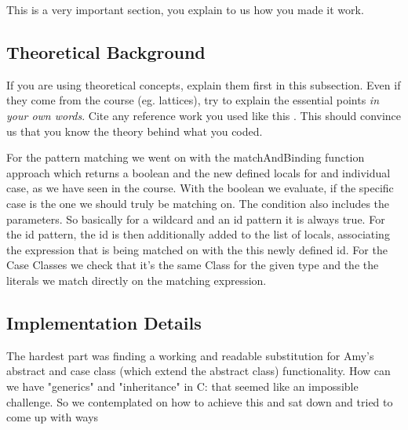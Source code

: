 This is a very important section, you explain to us how you made it work.

\subsection{Theoretical Background}
If you are using theoretical concepts, explain them first in this subsection.
Even if they come from the course (eg. lattices), try to explain the essential
points \emph{in your own words}. Cite any reference work you used like this
\cite{TigerBook}. This should convince us that you know the theory behind what
you coded.

For the pattern matching we went on with the matchAndBinding function approach which returns a boolean and the new defined locals for and individual case, as we have seen in the course. With the boolean we evaluate, if the specific case is the one we should truly be matching on. The condition also includes the parameters. So basically for a wildcard and an id pattern it is always true. For the id pattern, the id is then additionally added to the list of locals, associating the expression that is being matched on with the this newly defined id.
For the Case Classes we check that it's the same Class for the given type and the the literals we match directly on the matching expression.

\subsection{Implementation Details}
%
The hardest part was finding a working and readable substitution for Amy's abstract and case class (which extend the abstract class) functionality.
How can we have "generics" and "inheritance" in C: that seemed like an impossible challenge.
So we contemplated on how to achieve this and sat down and tried to come up with ways
